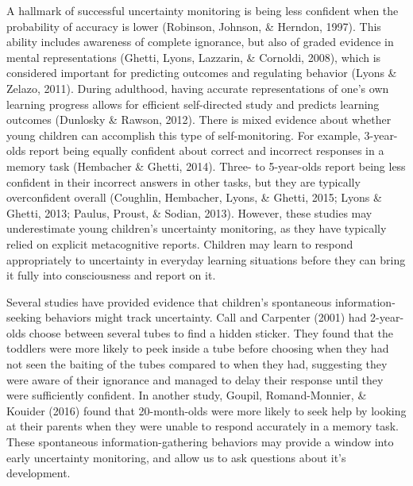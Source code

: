 \documentclass[10pt, letterpaper]{article}
\begin{document}
A hallmark of successful uncertainty monitoring is being less confident
when the probability of accuracy is lower (Robinson, Johnson, \&
Herndon, 1997). This ability includes awareness of complete ignorance,
but also of graded evidence in mental representations (Ghetti, Lyons,
Lazzarin, \& Cornoldi, 2008), which is considered important for
predicting outcomes and regulating behavior (Lyons \& Zelazo, 2011).
During adulthood, having accurate representations of one's own learning
progress allows for efficient self-directed study and predicts learning
outcomes (Dunlosky \& Rawson, 2012). There is mixed evidence about
whether young children can accomplish this type of self-monitoring. For
example, 3-year-olds report being equally confident about correct and
incorrect responses in a memory task (Hembacher \& Ghetti, 2014). Three-
to 5-year-olds report being less confident in their incorrect answers in
other tasks, but they are typically overconfident overall (Coughlin,
Hembacher, Lyons, \& Ghetti, 2015; Lyons \& Ghetti, 2013; Paulus,
Proust, \& Sodian, 2013). However, these studies may underestimate young
children's uncertainty monitoring, as they have typically relied on
explicit metacognitive reports. Children may learn to respond
appropriately to uncertainty in everyday learning situations before they
can bring it fully into consciousness and report on it.

Several studies have provided evidence that children's spontaneous
information-seeking behaviors might track uncertainty. Call and
Carpenter (2001) had 2-year-olds choose between several tubes to find a
hidden sticker. They found that the toddlers were more likely to peek
inside a tube before choosing when they had not seen the baiting of the
tubes compared to when they had, suggesting they were aware of their
ignorance and managed to delay their response until they were
sufficiently confident. In another study, Goupil, Romand-Monnier, \&
Kouider (2016) found that 20-month-olds were more likely to seek help by
looking at their parents when they were unable to respond accurately in
a memory task. These spontaneous information-gathering behaviors may
provide a window into early uncertainty monitoring, and allow us to ask
questions about it's development.
\end{document}
